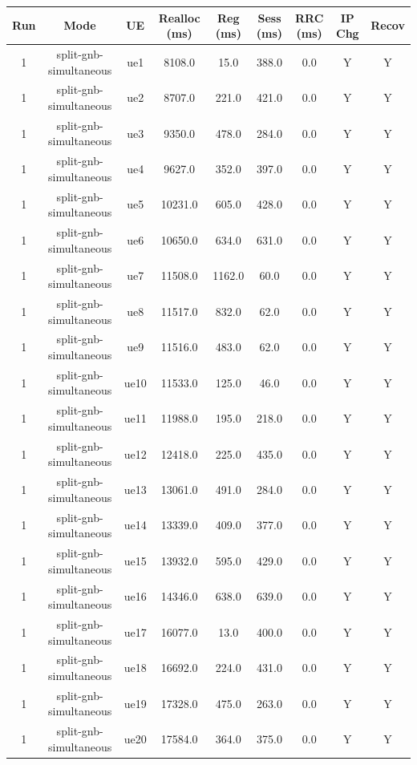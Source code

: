 \begin{table}[ht]
\centering
\begin{tabular}{|c|c|c|c|c|c|c|c|c|}
\hline
Run & Mode & UE & Realloc (ms) & Reg (ms) & Sess (ms) & RRC (ms) & IP Chg & Recov \\
\hline
1 & split-gnb-simultaneous & ue1 & 8108.0 & 15.0 & 388.0 & 0.0 & Y & Y \\
1 & split-gnb-simultaneous & ue2 & 8707.0 & 221.0 & 421.0 & 0.0 & Y & Y \\
1 & split-gnb-simultaneous & ue3 & 9350.0 & 478.0 & 284.0 & 0.0 & Y & Y \\
1 & split-gnb-simultaneous & ue4 & 9627.0 & 352.0 & 397.0 & 0.0 & Y & Y \\
1 & split-gnb-simultaneous & ue5 & 10231.0 & 605.0 & 428.0 & 0.0 & Y & Y \\
1 & split-gnb-simultaneous & ue6 & 10650.0 & 634.0 & 631.0 & 0.0 & Y & Y \\
1 & split-gnb-simultaneous & ue7 & 11508.0 & 1162.0 & 60.0 & 0.0 & Y & Y \\
1 & split-gnb-simultaneous & ue8 & 11517.0 & 832.0 & 62.0 & 0.0 & Y & Y \\
1 & split-gnb-simultaneous & ue9 & 11516.0 & 483.0 & 62.0 & 0.0 & Y & Y \\
1 & split-gnb-simultaneous & ue10 & 11533.0 & 125.0 & 46.0 & 0.0 & Y & Y \\
1 & split-gnb-simultaneous & ue11 & 11988.0 & 195.0 & 218.0 & 0.0 & Y & Y \\
1 & split-gnb-simultaneous & ue12 & 12418.0 & 225.0 & 435.0 & 0.0 & Y & Y \\
1 & split-gnb-simultaneous & ue13 & 13061.0 & 491.0 & 284.0 & 0.0 & Y & Y \\
1 & split-gnb-simultaneous & ue14 & 13339.0 & 409.0 & 377.0 & 0.0 & Y & Y \\
1 & split-gnb-simultaneous & ue15 & 13932.0 & 595.0 & 429.0 & 0.0 & Y & Y \\
1 & split-gnb-simultaneous & ue16 & 14346.0 & 638.0 & 639.0 & 0.0 & Y & Y \\
1 & split-gnb-simultaneous & ue17 & 16077.0 & 13.0 & 400.0 & 0.0 & Y & Y \\
1 & split-gnb-simultaneous & ue18 & 16692.0 & 224.0 & 431.0 & 0.0 & Y & Y \\
1 & split-gnb-simultaneous & ue19 & 17328.0 & 475.0 & 263.0 & 0.0 & Y & Y \\
1 & split-gnb-simultaneous & ue20 & 17584.0 & 364.0 & 375.0 & 0.0 & Y & Y \\

\end{tabular}
\end{table}
